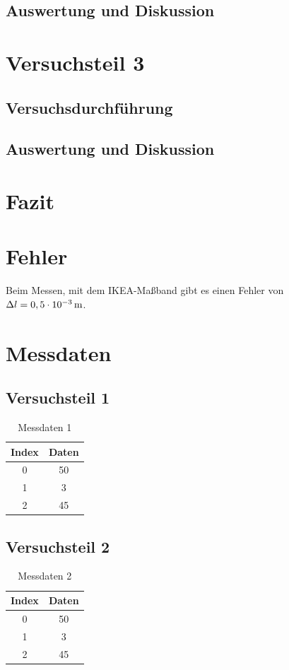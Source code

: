 \documentclass{Praktikum}
\begin{document}
\subsection{Auswertung und Diskussion}
\lipsum[2-3]

\section{Versuchsteil 3}
\subsection{Versuchsdurchführung}
\lipsum[4]

\subsection{Auswertung und Diskussion}
\lipsum[2-3]

\section{Fazit}
\lipsum[1]

\newpage
\Anhang
\section{Fehler}
Beim Messen, mit dem IKEA-Maßband gibt es einen Fehler von $\Delta l=0,5\cdot10^{-3}\,\text{m}$.

\section{Messdaten}
\subsection{Versuchsteil 1}
\begin{table}[H]
    \centering
    \begin{tabular}{|c|c|}
        \hline
        Index & Daten \\\hline
        0 & 50 \\
        1 & 3 \\
        2 & 45\\\hline
    \end{tabular}
    \caption{Messdaten 1}
    \label{tab: MD1}
\end{table}

\subsection{Versuchsteil 2}
\begin{table}[H]
    \centering
    \begin{tabular}{|c|c|}
        \hline
        Index & Daten \\\hline
        0 & 50 \\
        1 & 3 \\
        2 & 45\\\hline
    \end{tabular}
    \caption{Messdaten 2}
    \label{tab: MD2}
\end{table}
\end{document}
